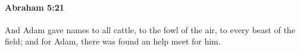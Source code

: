 
		\paragraph{Abraham 5:21} %
			\label{ABRAHAM-5-21}

			And Adam gave names to all cattle, to the fowl of the air, to every beast of the field; and for Adam, there was found an help meet for him.

